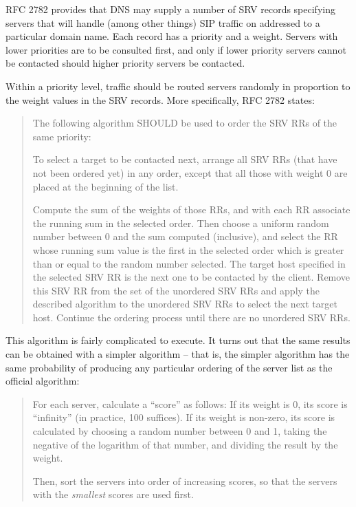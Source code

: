
\def\Pr#1{\textrm{Pr}(\textrm{#1})}



RFC 2782 provides that DNS may supply a number of SRV records
specifying servers that will handle (among other things) SIP traffic
on addressed to a particular domain name.
Each record has a priority and a weight.
Servers with lower priorities are to be consulted first, and only if
lower priority servers cannot be contacted should higher priority
servers be contacted.

Within a priority level, traffic should be routed servers randomly in
proportion to the weight values in the SRV records.  More specifically, RFC
2782 states:

\begin{quotation}

The following
algorithm SHOULD be used to order the SRV RRs of the same
priority:

To select a target to be contacted next, arrange all SRV RRs
(that have not been ordered yet) in any order, except that all
those with weight 0 are placed at the beginning of the list.

Compute the sum of the weights of those RRs, and with each RR
associate the running sum in the selected order. Then choose a
uniform random number between 0 and the sum computed
(inclusive), and select the RR whose running sum value is the
first in the selected order which is greater than or equal to
the random number selected. The target host specified in the
selected SRV RR is the next one to be contacted by the client.
Remove this SRV RR from the set of the unordered SRV RRs and
apply the described algorithm to the unordered SRV RRs to select
the next target host.  Continue the ordering process until there
are no unordered SRV RRs.

\end{quotation}

This algorithm is fairly complicated to execute.  It turns out that
the same results can be obtained with a simpler algorithm -- that is,
the simpler algorithm has the same probability of  producing any
particular ordering of the server list  as the official algorithm:

\begin{quotation}

For each server, calculate a ``score'' as follows:  If its weight is 0,
its score is ``infinity'' (in practice, 100 suffices).  If its
weight is non-zero, its score is calculated by
choosing a random number between 0 and 1, taking the negative of the
logarithm of that
number, and dividing the result by the weight.

Then, sort the servers into order of increasing scores, so that the
servers with the {\it smallest} scores are used first.

\end{quotation}

